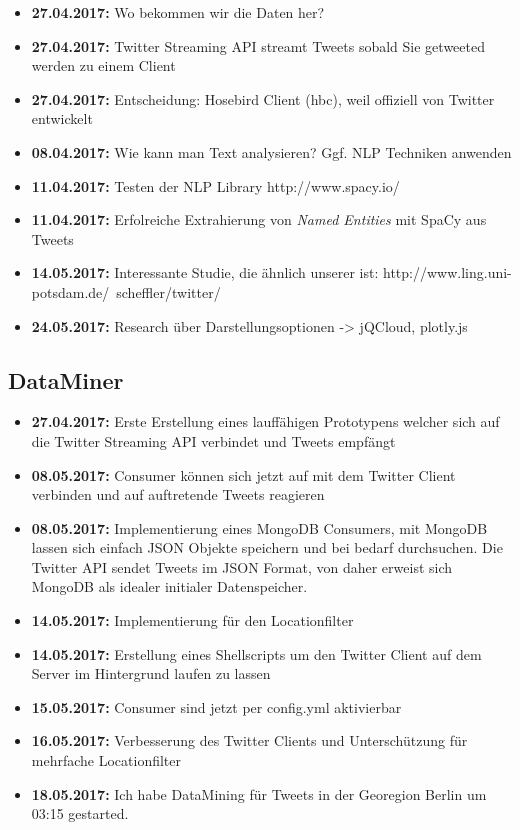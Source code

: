 \documentclass[12pt, 
	a4paper, 
	oneside, 
	leqno]{scrreprt}
\begin{document}
\begin{itemize}
  \item \textbf{27.04.2017:} Wo bekommen wir die Daten her?
  \item \textbf{27.04.2017:} Twitter Streaming API streamt Tweets sobald Sie getweeted werden zu einem Client
  \item \textbf{27.04.2017:} Entscheidung: Hosebird Client (hbc), weil offiziell von Twitter entwickelt
  \item \textbf{08.04.2017:} Wie kann man Text analysieren? Ggf. NLP Techniken anwenden
  \item \textbf{11.04.2017:} Testen der NLP Library http://www.spacy.io/
  \item \textbf{11.04.2017:} Erfolreiche Extrahierung von \textit{Named Entities} mit SpaCy aus Tweets
  \item \textbf{14.05.2017:} Interessante Studie, die ähnlich unserer ist: http://www.ling.uni-potsdam.de/~scheffler/twitter/
  \item \textbf{24.05.2017:} Research über Darstellungsoptionen -> jQCloud, plotly.js
\end{itemize}

\subsection*{DataMiner}

\begin{itemize}
  \item \textbf{27.04.2017:} Erste Erstellung eines lauffähigen Prototypens welcher sich auf die Twitter Streaming API verbindet und Tweets empfängt
  \item \textbf{08.05.2017:} Consumer können sich jetzt auf mit dem Twitter Client verbinden und auf auftretende Tweets reagieren
  \item \textbf{08.05.2017:} Implementierung eines MongoDB Consumers, mit MongoDB lassen sich einfach JSON Objekte speichern und bei bedarf durchsuchen. Die Twitter API sendet Tweets im JSON Format, von daher erweist sich MongoDB als idealer initialer Datenspeicher.
  \item \textbf{14.05.2017:} Implementierung für den Locationfilter
  \item \textbf{14.05.2017:} Erstellung eines Shellscripts um den Twitter Client auf dem Server im Hintergrund laufen zu lassen
  \item \textbf{15.05.2017:} Consumer sind jetzt per config.yml aktivierbar
  \item \textbf{16.05.2017:} Verbesserung des Twitter Clients und Unterschützung für mehrfache Locationfilter
  \item \textbf{18.05.2017:} Ich habe DataMining für Tweets in der Georegion Berlin um 03:15 gestarted.
\end{itemize}
\end{document}
